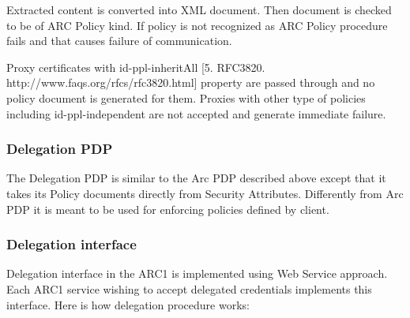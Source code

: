 \documentclass{article}
\begin{document}
{\upshape\color{black}
Extracted content is converted into XML document. Then document is
checked to be of ARC Policy kind. If policy is not recognized as ARC
Policy procedure fails and that causes failure of communication.}

{\upshape\color{black}
Proxy certificates with id-ppl-inheritAll [5. RFC3820.
http://www.faqs.org/rfcs/rfc3820.html] property are passed through and
no policy document is generated for them. Proxies with other type of
policies including id-ppl-independent are not accepted and generate
immediate failure.}

\subsubsection[Delegation PDP]{Delegation PDP}
\label{bkm:Ref204009695}{\upshape\color{black}
The Delegation PDP is similar to the Arc PDP described above except that
it takes it{\textquotesingle}s Policy documents directly from Security
Attributes. Differently from Arc PDP it is meant to be used for
enforcing policies defined by client.}

\subsubsection[Delegation interface]{Delegation interface}
\label{bkm:Ref204009766}{\upshape\color{black}
Delegation interface in the ARC1 is implemented using Web Service
approach. Each ARC1 service wishing to accept delegated credentials
implements this interface. Here is how delegation procedure works:}
\end{document}
